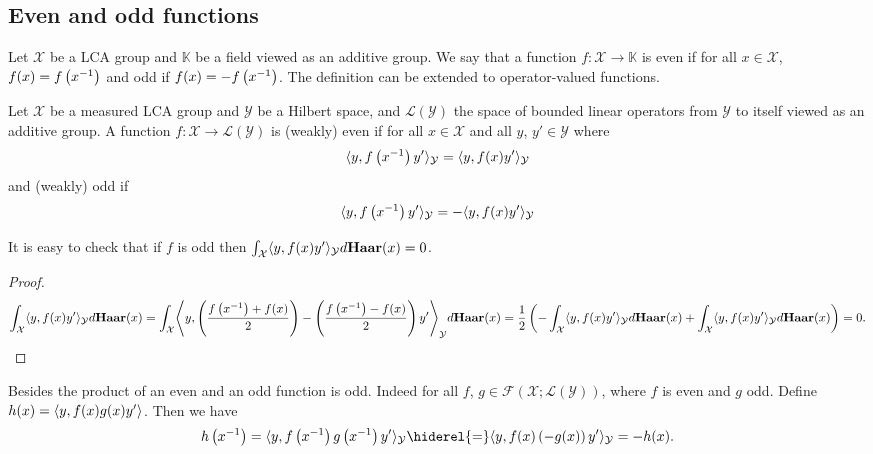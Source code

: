 \subsection{Even and odd functions}
Let $\mathcal{X}$ be a \acs{LCA} group and $\mathbb{K}$ be a field viewed as an additive group. We say that a function $f:\mathcal{X}\to\mathbb{K}$ is even if for all $x\in\mathcal{X}$, $f(x)=f\left({x}^{-1}\right)$ and odd if $f(x)=-f\left({x}^{-1}\right)$. The definition can be extended to operator-valued functions.
\begin{definition}
Let $\mathcal{X}$ be a measured \acs{LCA} group and $\mathcal{Y}$ be a Hilbert space, and $\mathcal{L}(\mathcal{Y})$ the space of bounded linear operators from $\mathcal{Y}$ to itself viewed as an additive group. A function $f:\mathcal{X}\to\mathcal{L}(\mathcal{Y})$ is (weakly) even if for all $x\in\mathcal{X}$ and all $y$, $y'\in\mathcal{Y}$ where $\mathcal{}$
\begin{dmath}
\inner{y,f\left(\inv{x}\right)y'}_{\mathcal{Y}}=\inner{y,f(x)y'}_{\mathcal{Y}}
\end{dmath}
and (weakly) odd if
\begin{dmath}
\inner{y,f\left(\inv{x}\right)y'}_{\mathcal{Y}}=-\inner{y,f(x)y'}_{\mathcal{Y}}
\end{dmath}
\end{definition}
It is easy to check that if $f$ is odd then $\int_{\mathcal{X}}\langle y,f(x)y'\rangle_{\mathcal{Y}}d\mathbf{Haar}(x)=0$.
\begin{proof}
\begin{dmath*}
\int_{\mathcal{X}}\inner{y,f(x)y'}_{\mathcal{Y}}d\Haar(x)=\int_{\mathcal{X}}\inner*{y,\left(\frac{f\left(\inv{x}\right) + f(x)}{2}\right)-\left(\frac{f\left(\inv{x}\right) - f(x)}{2}\right)y'}_{\mathcal{Y}}d\Haar(x)
=\frac{1}{2}\left(-\int_{\mathcal{X}}\inner{y,f(x)y'}_{\mathcal{Y}}d\Haar(x) + \int_{\mathcal{X}}\inner{y,f(x)y'}_{\mathcal{Y}}d\Haar(x)\right)
=0.
\end{dmath*}
\end{proof}
Besides the product of an even and an odd function is odd. Indeed for all $f$, $g\in\mathcal{F}(\mathcal{X};\mathcal{L}(\mathcal{Y}))$, where $f$ is even and $g$ odd. Define $h(x)=\langle y,f(x)g(x)y'\rangle$. Then we have
\begin{dmath}
h\left(\inv{x}\right)=\inner{y,f\left(\inv{x}\right)g\left(\inv{x}\right)y'}_{\mathcal{Y}}
\hiderel{=}\inner{y,f(x)\left(-g(x)\right)y'}_{\mathcal{Y}}
=-h(x).
\end{dmath}

